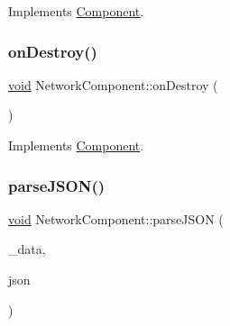 Implements \hyperlink{classComponent_a3a1537a8b8bcdb2155afbb925c77b0a2}{Component}.

\mbox{\label{classNetworkComponent_a3361f9b02b8b5c0bed3beb4d70c28bdb}} 
\subsubsection{\texorpdfstring{on\+Destroy()}{onDestroy()}}
{\footnotesize\ttfamily \hyperlink{imgui__impl__opengl3__loader_8h_ac668e7cffd9e2e9cfee428b9b2f34fa7}{void} Network\+Component\+::on\+Destroy (\begin{DoxyParamCaption}{ }\end{DoxyParamCaption})\hspace{0.3cm}{\ttfamily [virtual]}}



Implements \hyperlink{classComponent_a2b198f27162a6caf63917e304295f892}{Component}.

\mbox{\label{classNetworkComponent_ab1bff9bb826d0fdc4af6a1c829121f2c}} 
\subsubsection{\texorpdfstring{parse\+J\+S\+O\+N()}{parseJSON()}}
{\footnotesize\ttfamily \hyperlink{imgui__impl__opengl3__loader_8h_ac668e7cffd9e2e9cfee428b9b2f34fa7}{void} Network\+Component\+::parse\+J\+S\+ON (\begin{DoxyParamCaption}\item[{\hyperlink{structGameData}{Game\+Data} $\ast$}]{\+\_\+data,  }\item[{const char $\ast$}]{json }\end{DoxyParamCaption})\hspace{0.3cm}{\ttfamily [private]}}

\mbox{\label{classNetworkComponent_a54fabbd4719383d31abd1262e279683e}} 
